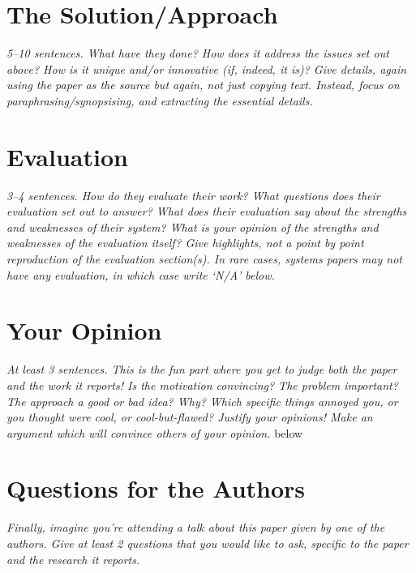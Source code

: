 \documentclass[11pt]{article}
\begin{document}
\section*{The Solution/Approach}

\textsl{5--10 sentences. What have they done? How does it address the issues
set out above? How is it unique and/or innovative (if, indeed, it is)? Give
details, again using the paper as the source but again, not just copying text.
Instead, focus on paraphrasing/synopsising, and extracting the essential
details.}


\section*{Evaluation}

\textsl{3--4 sentences. How do they evaluate their work? What questions does
their evaluation set out to answer? What does their evaluation say about the
strengths and weaknesses of their system? What is your opinion of the strengths
and weaknesses of the evaluation itself? Give highlights, not a point by point
reproduction of the evaluation section(s). In rare cases, systems papers may
not have any evaluation, in which case write `N/A' below.}


\section*{Your Opinion}

\textsl{At least 3 sentences. This is the fun part where you get to judge both
the paper and the work it reports! Is the motivation convincing? The problem
important? The approach a good or bad idea? Why? Which specific things annoyed
you, or you thought were cool, or cool-but-flawed? Justify your opinions! Make
an argument which will convince others of your opinion.}
below


\section*{Questions for the Authors}

\textsl{Finally, imagine you're attending a talk about this paper given by one
of the authors. Give at least 2 questions that you would like to ask, specific
to the paper and the research it reports.}




\end{document}
